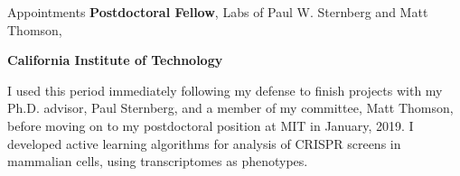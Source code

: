 \begin{rubric}{Appointments}
\entry*[11/2018--01/2019]
		\textbf{Postdoctoral Fellow}, Labs of Paul W. Sternberg and Matt Thomson,\par
		\textbf{California Institute of Technology}\par
		I used this period immediately following my defense to finish
		projects with my Ph.D. advisor, Paul Sternberg, and a member of my
		committee, Matt Thomson, before moving on to my postdoctoral position
		at MIT in January, 2019. I developed active learning algorithms for analysis
		of CRISPR screens in mammalian cells, using transcriptomes as phenotypes.

\end{rubric}
